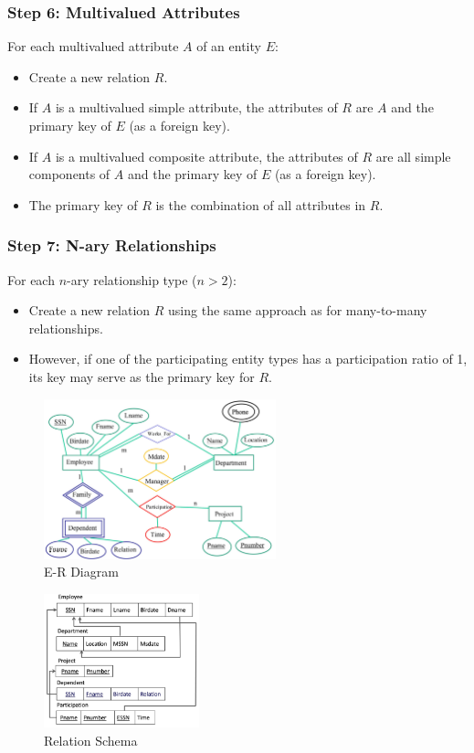 \subsubsection{Step 6: Multivalued Attributes}
For each multivalued attribute \(A\) of an entity \(E\):  
\begin{itemize}
  \item Create a new relation \(R\).  
  \item If \(A\) is a multivalued simple attribute, the attributes of \(R\) are \(A\) and the primary key of \(E\) (as a foreign key).  
  \item If \(A\) is a multivalued composite attribute, the attributes of \(R\) are all simple components of \(A\) and the primary key of \(E\) (as a foreign key).  
  \item The primary key of \(R\) is the combination of all attributes in \(R\).  
\end{itemize}

\subsubsection{Step 7: N-ary Relationships}
For each \(n\)-ary relationship type (\(n > 2\)):  
\begin{itemize}
  \item Create a new relation \(R\) using the same approach as for many-to-many relationships.  
  \item However, if one of the participating entity types has a participation ratio of 1, its key may serve as the primary key for \(R\).  
\end{itemize}

\begin{figure}[H]
  \centering
  \includegraphics[width=0.6\textwidth]{Figure/Mapping1.pdf}
  \caption{E-R Diagram}
\end{figure}

\begin{figure}[H]
  \centering
  \includegraphics[width=0.4\textwidth]{Figure/Mapping2.pdf}
  \caption{Relation Schema}
\end{figure}

